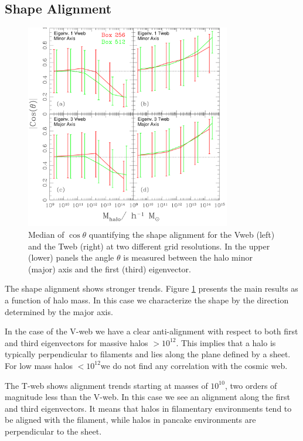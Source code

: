 \documentclass[usenatbib]{mn2e}
\newcommand{\hMsun}{{\ifmmode{h^{-1}{\rm
        {M_{\odot}}}}\else{$h^{-1}{\rm{M_{\odot}}}$}\fi}}
\begin{document}
\subsection{Shape Alignment}

\begin{figure}
\includegraphics[width=0.80\textwidth]{Fig2.pdf}
\caption{Median of $\cos\theta$ quantifying the shape alignment for
  the Vweb (left) and the Tweb (right) at two different grid
  resolutions. In the upper (lower) panels the angle $\theta$ is
  measured between the halo minor (major) axis and the first (third)
  eigenvector.\label{fig:shape_alignment}} 
\end{figure}

The shape alignment shows stronger trends. Figure
\ref{fig:shape_alignment} presents the main results as a function of
halo mass. In this case we characterize the shape by the direction
determined by the major axis.

In the case of the V-web we have a clear anti-alignment with respect
to both first and third eigenvectors for massive halos
$>10^{12}$\hMsun. This implies that a halo is typically perpendicular to 
filaments and lies along the plane defined by a sheet. For low mass
halos $<10^{12}$\hMsun we do not find any correlation with the
cosmic web.

The T-web shows alignment  trends starting at masses of
$10^{10}$\hMsun, two orders of magnitude less than the V-web. In this
case we see an alignment along the first and third eigenvectors. It
means that halos in filamentary environments tend to be aligned with
the filament, while halos in pancake environments are perpendicular to
the sheet. 
\end{document}
